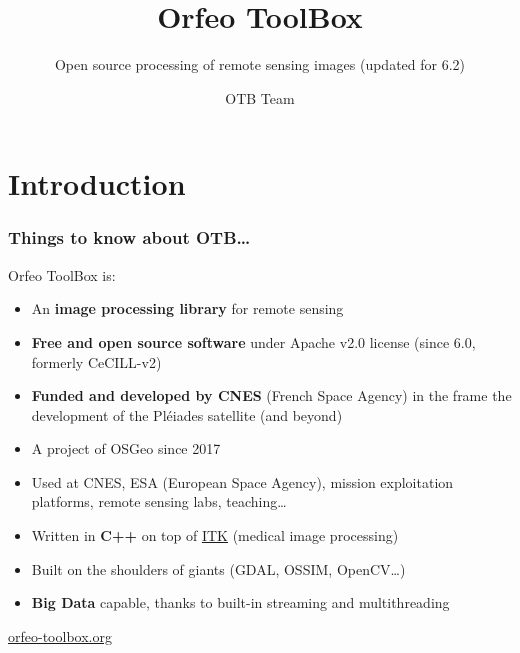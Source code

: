 \documentclass[8pt]{beamer}
\title{Orfeo ToolBox}
\subtitle{Open source processing of remote sensing images (updated for 6.2)}
\author{OTB Team}
\date{}
\begin{document}
\begin{frame}
\titlepage
\end{frame}

\section*{Introduction}

\begin{frame}
\frametitle{Things to know about OTB\ldots}
\begin{block}{Orfeo ToolBox is:}
\begin{itemize}
\item An \textbf{image processing library} for remote sensing
\item \textbf{Free and open source software} under Apache v2.0 license (since 6.0, formerly CeCILL-v2)
\item \textbf{Funded and developed by CNES} (French Space Agency) in the frame
  the development of the Pléiades satellite (and beyond)
\item A project of OSGeo since 2017
\item Used at CNES, ESA (European Space Agency), mission exploitation platforms,
  remote sensing labs, teaching\ldots
\item Written in \textbf{C++} on top of \href{www.itk.org}{ITK} (medical image
  processing)
\item Built on the shoulders of giants (GDAL, OSSIM, OpenCV\ldots)
\item \textbf{Big Data} capable, thanks to built-in streaming and multithreading
\end{itemize}
\end{block}

\begin{center}
{\huge\textcolor{red}{\href{http://www.orfeo-toolbox.org}{orfeo-toolbox.org}}}
\end{center}

\end{frame}
\end{document}
